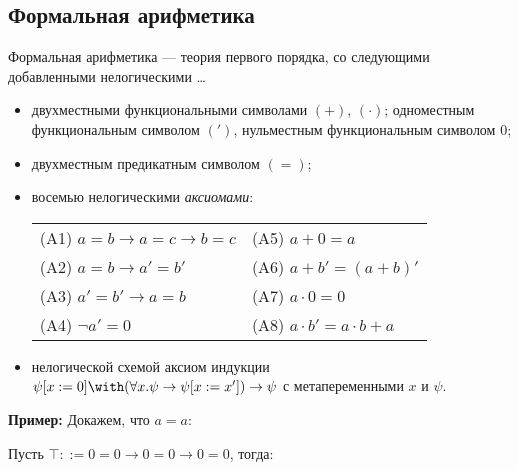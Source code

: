 \subsection{Формальная арифметика}

Формальная арифметика --- теория первого порядка, со следующими добавленными нелогическими \dots
\begin{itemize}
\item двухместными функциональными символами $(+)$, $(\cdot)$; одноместным функциональным символом $(')$, 
нульместным функциональным символом $0$;
\item двухместным предикатным символом $(=)$;
\item восемью нелогическими \emph{аксиомами}:\vspace{0.1cm}

\begin{tabular}{ll}
(A1) $a=b \to a=c \to b=c$             &(A5) $a+0 = a$                     \\
(A2) $a=b \to a'=b'$                   &(A6) $a+b' = (a+b)'$               \\
(A3) $a'=b' \to a=b$                   &(A7) $a\cdot 0 = 0$                \\
(A4) $\neg a' = 0$                     &(A8) $a\cdot b' = a \cdot b + a$
\end{tabular}
\item нелогической схемой аксиом индукции $\psi[x:=0]\with(\forall x.\psi\to \psi[x:=x'])\to \psi$ с метапеременными $x$ и $\psi$.
\end{itemize}

\textbf{Пример:} Докажем, что $a=a$:

Пусть $\top ::= 0=0\to 0=0 \to 0=0$, тогда:

